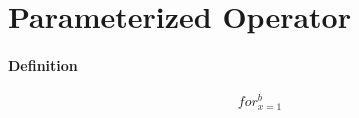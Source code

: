 \documentclass{article}
\begin{document}
\section{Parameterized Operator}
\paragraph{Definition}
\[ for_{x=1}^b \]
\end{document}
